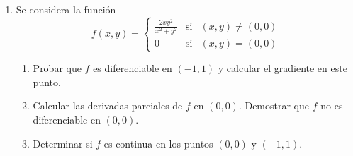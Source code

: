 \documentclass[11pt]{book}
\theoremstyle{definicion}
\theoremstyle{teorema}
\theoremstyle{ejemplo}
\begin{document}
\begin{enumerate}
\item Se considera la funci\'on 
$$f(x,y)=\left\{ 
\begin{array}{ccc}
\frac{2 xy^2}{x^{2}+y^{2}} & \text{si} & \left( x,y\right) \neq \left(
0,0\right)  \\ 
0 & \text{si} & \left( x,y\right) =\left( 0,0\right) 
\end{array}%
\right. $$
\begin{enumerate}
\item Probar que $f$ es diferenciable en $(-1,1)$ y calcular el gradiente en este punto.
\item Calcular las derivadas parciales de $f$ en $(0,0)$. Demostrar que $f$ no es diferenciable en $(0,0)$.
\item Determinar si $f$ es continua en los puntos $(0,0)$  y $(-1,1)$.
\end{enumerate}

\end{enumerate}
\end{document}

